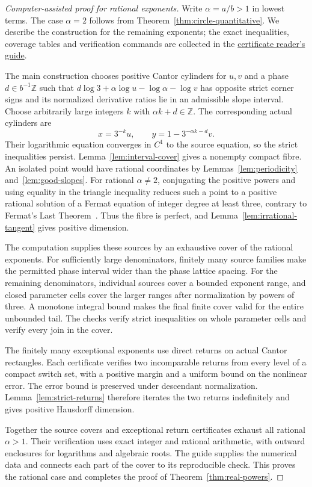 \documentclass[11pt,a4paper]{amsart}
\numberwithin{equation}{section}
\theoremstyle{definition}
\begin{document}
\begin{proof}[Computer-assisted proof for rational exponents]
Write \(\alpha=a/b>1\) in lowest terms. The case \(\alpha=2\) follows
from Theorem~\ref{thm:circle-quantitative}. We describe the construction
for the remaining exponents; the exact inequalities, coverage tables
and verification commands are collected in the
\href{https://github.com/Nero-17/LEAN-Formalisation-solutions-of-fermat-cantor-equation/blob/9ec893bcef7a71504234be897a16949c0a1f8313/docs/certificate-guide.pdf}{certificate reader's guide}.

The main construction chooses positive Cantor cylinders for \(u,v\)
and a phase \(d\in b^{-1}\mathbb Z\) such that
\(d\log3+\alpha\log u-\log\alpha-\log v\) has opposite strict
corner signs and its normalized derivative ratios lie in an admissible
slope interval. Choose arbitrarily large integers \(k\) with
\(\alpha k+d\in\mathbb Z\). The corresponding actual cylinders are
\[
x=3^{-k}u,\qquad y=1-3^{-\alpha k-d}v.
\]
Their logarithmic equation converges in \(C^1\) to the source equation,
so the strict inequalities persist. Lemma~\ref{lem:interval-cover}
gives a nonempty compact fibre. An isolated point would have rational
coordinates by Lemmas~\ref{lem:periodicity} and~\ref{lem:good-slopes}.
For rational \(\alpha\ne2\), conjugating the positive powers and using
equality in the triangle inequality reduces such a point to a positive
rational solution of a Fermat equation of integer degree at least three,
contrary to Fermat's Last Theorem~\cite{Wiles1995,TaylorWiles1995}.
Thus the fibre is perfect, and Lemma~\ref{lem:irrational-tangent}
gives positive dimension.

The computation supplies these sources by an exhaustive cover of the
rational exponents. For sufficiently large denominators, finitely many
source families make the permitted phase interval wider than the phase
lattice spacing. For the remaining denominators, individual sources
cover a bounded exponent range, and closed parameter cells cover the
larger ranges after normalization by powers of three. A monotone integral
bound makes the final finite cover valid for the entire unbounded tail.
The checks verify strict inequalities on whole parameter cells and
verify every join in the cover.

The finitely many exceptional exponents use direct returns on actual
Cantor rectangles. Each certificate verifies two incomparable returns
from every level of a compact switch set, with a positive margin and a
uniform bound on the nonlinear error. The error bound is preserved under
descendant normalization. Lemma~\ref{lem:strict-returns} therefore
iterates the two returns indefinitely and gives positive Hausdorff
dimension.

Together the source covers and exceptional return certificates exhaust
all rational \(\alpha>1\). Their verification uses exact integer and
rational arithmetic, with outward enclosures for logarithms and algebraic
roots. The guide supplies the numerical data and connects each part of
the cover to its reproducible check. This proves the rational case and
completes the proof of Theorem~\ref{thm:real-powers}.
\end{proof}
\end{document}
